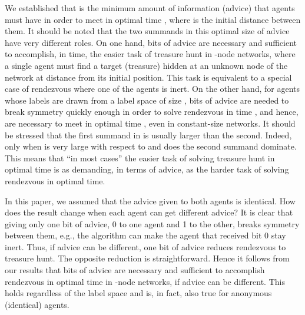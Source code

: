 \documentclass{llncs}
\begin{document}
We established that   is the minimum amount of information (advice) that agents must have in order to meet in optimal time , where  is the initial distance between them.
It should be noted that the two summands in this optimal size of advice have very different roles. 
On one hand,  bits of advice are necessary and sufficient
to accomplish, in  time, the easier task of treasure hunt in -node networks, where a single agent must find a target (treasure) hidden at an unknown node of the network
at distance  from its initial position. This task is equivalent to a special case of rendezvous where one of the agents is inert. On the other hand, for agents whose labels are drawn from a label space of size ,
 bits of advice are needed to break symmetry quickly enough 
in order to solve rendezvous in time ,  
and hence, are necessary to meet in optimal time ,  even in constant-size networks.
 It should be stressed that the first summand in  is usually larger than the second. Indeed, only when  is very large with respect to  and  does the second summand dominate. This means that  ``in most cases'' the easier task of solving treasure hunt in optimal time is as demanding,
 in terms of advice,  as the harder task of solving rendezvous in optimal time.
 
 In this paper, we assumed that the advice given to both agents is identical. How does the result change when each agent can get different advice? It is clear that
 giving only one bit of advice, 0 to one agent and 1 to the other, breaks symmetry between them, e.g., the algorithm can make the agent that received bit 0 stay inert. Thus, if advice can be different,
 one bit of advice reduces rendezvous to treasure hunt. The opposite reduction is straightforward. 
 Hence it follows from our results that  bits of advice are necessary and sufficient
 to accomplish rendezvous in optimal time  in -node networks, if advice can be different. This holds regardless of the label space and is, in fact, 
 also true for anonymous (identical) agents.
 

 
\end{document}
